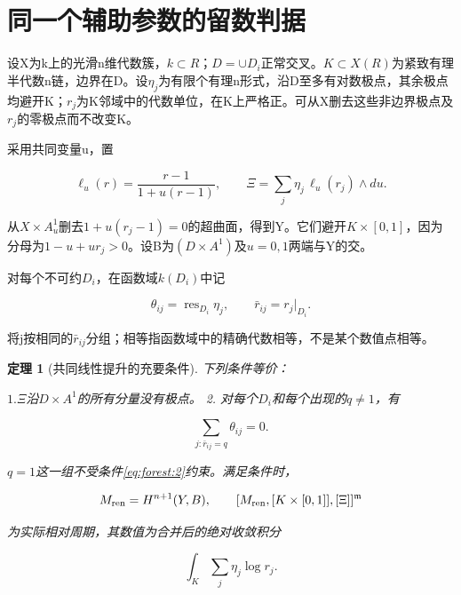 \documentclass[11pt,a4paper,oneside]{ctexrep}
\theoremstyle{cnplain}
\newtheorem{theorem}{定理}[chapter]
\theoremstyle{definition}
\theoremstyle{remark}
\begin{document}
\section{同一个辅助参数的留数判据}\label{sec:forest:1}

设X为k上的光滑n维代数簇，\(k\subset R\)；\(D=\cup D_i\)正常交叉。\(K\subset X(R)\)为紧致有理半代数n链，边界在D。设\(\eta _j\)为有限个有理n形式，沿D至多有对数极点，其余极点均避开K；\(r_j\)为K邻域中的代数单位，在K上严格正。可从X删去这些非边界极点及\(r_j\)的零极点而不改变K。

采用共同变量u，置

\begin{equation}
\ell_u(r)=\frac{r-1}{1+u(r-1)},\qquad
 \Xi=\sum_j\eta_j\,\ell_u(r_j)\wedge du.                         \label{eq:forest:1}
\end{equation}

从\(X\times A^{1}_u\)删去\(1+u(r_j- 1)=0\)的超曲面，得到Y。它们避开\(K\times [0,1]\)，因为分母为\(1- u+ur_j>0\)。设B为\((D\times A^{1})\)及\(u=0,1\)两端与Y的交。

对每个不可约\(D_i\)，在函数域\(k(D_i)\)中记

\begin{equation}
\theta_{ij}=\operatorname{res}_{D_i}\eta_j,\qquad
 \bar r_{ij}=r_j|_{D_i}.
\end{equation}

将j按相同的\(\bar r_{ij}\)分组；相等指函数域中的精确代数相等，不是某个数值点相等。

\begin{theorem}[共同线性提升的充要条件]

\label{thm:forest:1.1} 下列条件等价：

\(1. \Xi \)沿\(D\times A^{1}\)的所有分量没有极点。 2. 对每个\(D_i\)和每个出现的\(q\ne 1\)，有

\begin{equation}
\sum_{j:\bar r_{ij}=q}\theta_{ij}=0.          \label{eq:forest:2}
\end{equation}

\(q=1\)这一组不受条件\eqref{eq:forest:2}约束。满足条件时，

\begin{equation}
M_{\rm ren}=H^{n+1}(Y,B),\qquad
 [M_{\rm ren},[K\times[0,1]],[\Xi]]^{\mathfrak m}                \label{eq:forest:3}
\end{equation}

为实际相对周期，其数值为合并后的绝对收敛积分

\begin{equation}
\int_K\sum_j\eta_j\log r_j.                                    \label{eq:forest:4}
\end{equation}

\end{theorem}
\end{document}
